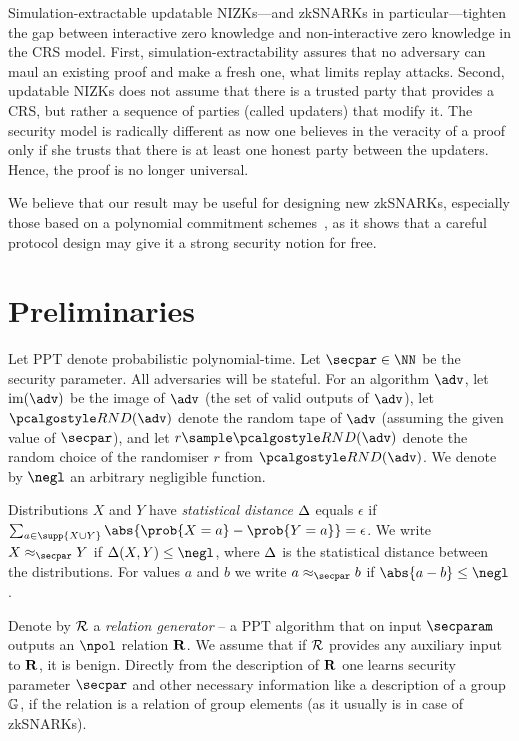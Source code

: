 \documentclass[runningheads,11pt]{llncs}
\theoremstyle{definition}
\begin{document}
Simulation-extractable updatable NIZKs---and zkSNARKs in particular---tighten the gap between interactive zero knowledge and non-interactive zero knowledge in the CRS model.
First, simulation-extractability assures that no adversary can maul an existing proof and make a fresh one, what limits replay attacks.
Second, updatable NIZKs does not assume that there is a trusted party that
provides a CRS, but rather a sequence of parties (called updaters) that modify
it. The security model is radically different as now one believes in the
veracity of a proof only if she trusts that there is at least one honest party
between the updaters. Hence, the proof is no longer
universal.

We believe that our result may be useful for designing new zkSNARKs, especially those based on a polynomial commitment schemes~\cite{AC:KatZavGol10}, as it shows that a careful protocol design may give it a strong security notion for free.

\section{Preliminaries}
Let PPT denote probabilistic polynomial-time.
Let $\secpar \in \NN$ be the security parameter.
All adversaries will be stateful.
For an algorithm $\adv$, let $\image (\adv)$ be the image of $\adv$ (the set of valid outputs of $\adv$), let $\RND{\adv}$ denote the random tape of $\adv$ (assuming the given value of $\secpar$), and let $r \sample \RND{\adv}$ denote the random choice of the randomiser $r$ from $\RND{\adv}$.
We denote by $\negl$ an arbitrary negligible function.

Distributions $X$ and $Y$ have \emph{statistical distance} $\Delta$ equals $\epsilon$ if $\sum_{a \in \supp{X \cup Y}} \abs{\prob{X = a} - \prob{Y = a}} = \epsilon$.
We write $X \approx_\secpar Y$ if $\SD(X, Y) \leq \negl$, where $\Delta$ is the statistical distance between the distributions.
For values $a$ and $b$ we write $a \approx_\secpar b$ if $\abs{a - b} \leq \negl$.

Denote by $\mathcal{R}$ a \emph{relation generator} -- a PPT algorithm that on input $\secparam$ outputs an $\npol$ relation $\mathbf{R}$. We assume that if $\mathcal{R}$ provides any auxiliary input to $\mathbf{R}$, it is benign. Directly from the description of $\mathbf{R}$ one learns security parameter $\secpar$ and other necessary information like a description of a group $\mathbb{G}$, if the relation is a relation of group elements (as it usually is in case of zkSNARKs).
\end{document}
